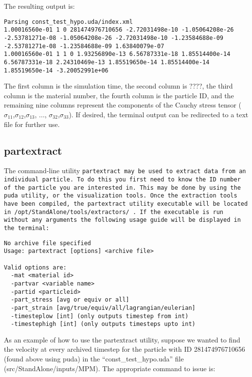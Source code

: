 The resulting output is:

\begin{Verbatim}[fontsize=\footnotesize]
Parsing const_test_hypo.uda/index.xml
1.00016560e-01 1 0 281474976710656 -2.72031498e-10 -1.05064208e-26 -2.53781271e-08 -1.05064208e-26 -2.72031498e-10 -1.23584688e-09 -2.53781271e-08 -1.23584688e-09 1.63840079e-07
1.00016560e-01 1 1 0 1.93256890e-13 6.56787331e-18 1.85514400e-14 6.56787331e-18 2.24310469e-13 1.85519650e-14 1.85514400e-14 1.85519650e-14 -3.20052991e+06
\end{Verbatim}

The first column is the simulation time, the second column is ????, the third column is the material number, the fourth column is the particle ID, and the remaining nine columns represent the components of the Cauchy stress tensor ($ \sigma_{11}$,$\sigma_{12}$,$\sigma_{13}$, ..., $\sigma_{32}$,$\sigma_{33}$).  If desired, the terminal output can be redirected to a text file for further use.

\subsection{partextract}

The command-line utility \tt partextract \normalfont may be used to extract data from an individual particle.  To do this you first need to know the ID number of the particle you are interested in.  This may be done by using the puda utility, or the visualization tools.  Once the extraction tools have been compiled, the partextract utility executable will be located in  \tt /opt/StandAlone/tools/extractors/ \normalfont.  If the executable is run without any arguments the following usage guide will be displayed in the terminal:

\begin{Verbatim}[fontsize=\footnotesize]
No archive file specified
Usage: partextract [options] <archive file>

Valid options are:
  -mat <material id>
  -partvar <variable name>
  -partid <particleid>
  -part_stress [avg or equiv or all]
  -part_strain [avg/true/equiv/all/lagrangian/eulerian]
  -timesteplow [int] (only outputs timestep from int)
  -timestephigh [int] (only outputs timesteps upto int)
\end{Verbatim}

As an example of how to use the partextract utility, suppose we wanted to find the velocity at every archived timestep for the particle with ID 281474976710656 (found above using puda) in the ``const\_test\_hypo.uda'' file (src/StandAlone/inputs/MPM).  The appropriate command to issue is:

